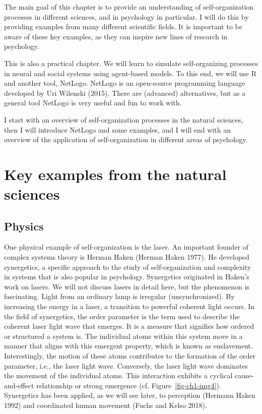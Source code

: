 \documentclass[
  letterpaper,
]{scrbook}
\begin{document}
The main goal of this chapter is to provide an understanding of
self-organization processes in different sciences, and in psychology in
particular. I will do this by providing examples from many different
scientific fields. It is important to be aware of these key examples, as
they can inspire new lines of research in psychology.

This is also a practical chapter. We will learn to simulate
self-organizing processes in neural and social systems using agent-based
models. To this end, we will use R and another tool, NetLogo. NetLogo is
an open-source programming language developed by Uri Wilenski (2015).
There are (advanced) alternatives, but as a general tool NetLogo is very
useful and fun to work with.

I start with an overview of self-organization processes in the natural
sciences, then I will introduce NetLogo and some examples, and I will
end with an overview of the application of self-organization in
different areas of psychology.

\hypertarget{key-examples-from-the-natural-sciences}{%
\section{Key examples from the natural
sciences}\label{key-examples-from-the-natural-sciences}}

\hypertarget{physics}{%
\subsection{Physics}\label{physics}}

One physical example of self-organization is the laser. An important
founder of complex systems theory is Herman Haken (Herman Haken 1977).
He developed synergetics, a specific approach to the study of
self-organization and complexity in systems that is also popular in
psychology. Synergetics originated in Haken's work on lasers. We will
not discuss lasers in detail here, but the phenomenon is fascinating.
Light from an ordinary lamp is irregular (unsynchronized). By increasing
the energy in a laser, a transition to powerful coherent light occurs.
In the field of synergetics, the order parameter is the term used to
describe the coherent laser light wave that emerges. It is a measure
that signifies how ordered or structured a system is. The individual
atoms within this system move in a manner that aligns with this emergent
property, which is known as enslavement. Interestingly, the motion of
these atoms contributes to the formation of the order parameter, i.e.,
the laser light wave. Conversely, the laser light wave dominates the
movement of the individual atoms. This interaction exhibits a cyclical
cause-and-effect relationship or strong emergence (cf.
Figure~\ref{fig-ch1-img4}). Synergetics has been applied, as we will see
later, to perception (Hermann Haken 1992) and coordinated human movement
(Fuchs and Kelso 2018).
\end{document}

